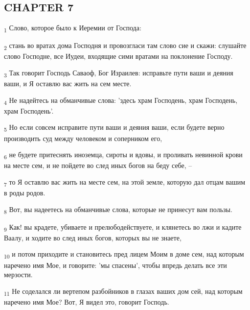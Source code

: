 \subsection{CHAPTER 7}
\begin{tcolorbox}
\textsubscript{1} Слово, которое было к Иеремии от Господа:
\end{tcolorbox}
\begin{tcolorbox}
\textsubscript{2} стань во вратах дома Господня и провозгласи там слово сие и скажи: слушайте слово Господне, все Иудеи, входящие сими вратами на поклонение Господу.
\end{tcolorbox}
\begin{tcolorbox}
\textsubscript{3} Так говорит Господь Саваоф, Бог Израилев: исправьте пути ваши и деяния ваши, и Я оставлю вас жить на сем месте.
\end{tcolorbox}
\begin{tcolorbox}
\textsubscript{4} Не надейтесь на обманчивые слова: 'здесь храм Господень, храм Господень, храм Господень'.
\end{tcolorbox}
\begin{tcolorbox}
\textsubscript{5} Но если совсем исправите пути ваши и деяния ваши, если будете верно производить суд между человеком и соперником его,
\end{tcolorbox}
\begin{tcolorbox}
\textsubscript{6} не будете притеснять иноземца, сироты и вдовы, и проливать невинной крови на месте сем, и не пойдете во след иных богов на беду себе, --
\end{tcolorbox}
\begin{tcolorbox}
\textsubscript{7} то Я оставлю вас жить на месте сем, на этой земле, которую дал отцам вашим в роды родов.
\end{tcolorbox}
\begin{tcolorbox}
\textsubscript{8} Вот, вы надеетесь на обманчивые слова, которые не принесут вам пользы.
\end{tcolorbox}
\begin{tcolorbox}
\textsubscript{9} Как! вы крадете, убиваете и прелюбодействуете, и клянетесь во лжи и кадите Ваалу, и ходите во след иных богов, которых вы не знаете,
\end{tcolorbox}
\begin{tcolorbox}
\textsubscript{10} и потом приходите и становитесь пред лицем Моим в доме сем, над которым наречено имя Мое, и говорите: 'мы спасены', чтобы впредь делать все эти мерзости.
\end{tcolorbox}
\begin{tcolorbox}
\textsubscript{11} Не соделался ли вертепом разбойников в глазах ваших дом сей, над которым наречено имя Мое? Вот, Я видел это, говорит Господь.
\end{tcolorbox}
